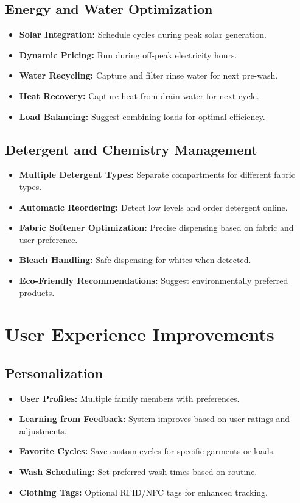 \subsection{Energy and Water Optimization}
\begin{itemize}
    \item \textbf{Solar Integration:} Schedule cycles during peak solar generation.
    \item \textbf{Dynamic Pricing:} Run during off-peak electricity hours.
    \item \textbf{Water Recycling:} Capture and filter rinse water for next pre-wash.
    \item \textbf{Heat Recovery:} Capture heat from drain water for next cycle.
    \item \textbf{Load Balancing:} Suggest combining loads for optimal efficiency.
\end{itemize}

\subsection{Detergent and Chemistry Management}
\begin{itemize}
    \item \textbf{Multiple Detergent Types:} Separate compartments for different fabric types.
    \item \textbf{Automatic Reordering:} Detect low levels and order detergent online.
    \item \textbf{Fabric Softener Optimization:} Precise dispensing based on fabric and user preference.
    \item \textbf{Bleach Handling:} Safe dispensing for whites when detected.
    \item \textbf{Eco-Friendly Recommendations:} Suggest environmentally preferred products.
\end{itemize}

\section{User Experience Improvements}

\subsection{Personalization}
\begin{itemize}
    \item \textbf{User Profiles:} Multiple family members with preferences.
    \item \textbf{Learning from Feedback:} System improves based on user ratings and adjustments.
    \item \textbf{Favorite Cycles:} Save custom cycles for specific garments or loads.
    \item \textbf{Wash Scheduling:} Set preferred wash times based on routine.
    \item \textbf{Clothing Tags:} Optional RFID/NFC tags for enhanced tracking.
\end{itemize}

